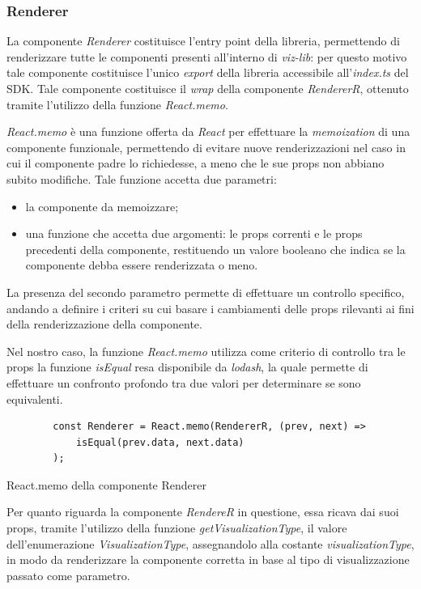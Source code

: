 \subsubsection{Renderer}
La componente \textit{Renderer} costituisce l'entry point della libreria, permettendo di renderizzare tutte le componenti presenti all'interno di
\textit{viz-lib}: per questo motivo tale componente costituisce l'unico \textit{export} della libreria accessibile all'\textit{index.ts} del SDK. \newline
Tale componente costituisce il \textit{wrap} della componente \textit{RendererR}, ottenuto tramite l'utilizzo della funzione \textit{React.memo}.
\begin{adjustwidth}{4em}{0pt}
    \textit{React.memo} è una funzione offerta da \textit{React} per effettuare la \textit{memoization} di una componente funzionale, permettendo di evitare
    nuove renderizzazioni nel caso in cui il componente padre lo richiedesse, a meno che le sue props non abbiano subito modifiche. \newline
    Tale funzione accetta due parametri:
    \begin{itemize}
        \item la componente da memoizzare;
        \item una funzione che accetta due argomenti: le props correnti e le props precedenti della componente, restituendo un valore booleano che indica
              se la componente debba essere renderizzata o meno.
    \end{itemize}
    La presenza del secondo parametro permette di effettuare un controllo specifico, andando a definire i criteri su cui basare i cambiamenti delle props
    rilevanti ai fini della renderizzazione della componente. \newline
\end{adjustwidth}
Nel nostro caso, la funzione \textit{React.memo} utilizza come criterio di controllo tra le props la funzione \textit{isEqual} resa disponibile da \textit{lodash},
la quale permette di effettuare un confronto profondo tra due valori per determinare se sono equivalenti. \newline
\begin{listing}[H]
    \begin{verbatim}
        const Renderer = React.memo(RendererR, (prev, next) =>
            isEqual(prev.data, next.data)
        );
  \end{verbatim}
    \caption{React.memo della componente Renderer}
    \label{listing:react_memo}
\end{listing}
Per quanto riguarda la componente \textit{RendereR} in questione, essa ricava dai suoi props, tramite l'utilizzo della funzione \textit{getVisualizationType}, il valore
dell'enumerazione \textit{VisualizationType}, assegnandolo alla costante \textit{visualizationType}, in modo da renderizzare la componente corretta in base al tipo di
visualizzazione passato come parametro.

